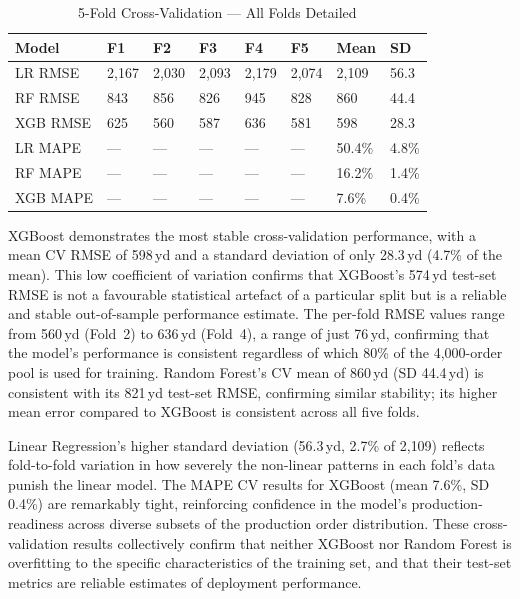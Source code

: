 {\scriptsize
\begin{table}[htbp]
\centering\tabcolsep=4pt\caption{5-Fold Cross-Validation --- All Folds Detailed}\label{tab:cv}
\begin{tabularx}{\textwidth}{@{}Z Y Y Y Y Y Y Y@{}}
  \toprule
  \textbf{Model}&\textbf{F1}&\textbf{F2}&\textbf{F3}&\textbf{F4}&\textbf{F5}&\textbf{Mean}&\textbf{SD}\\
  \midrule
  LR RMSE&2{,}167&2{,}030&2{,}093&2{,}179&2{,}074&2{,}109&56.3\\
  RF RMSE&843&856&826&945&828&860&44.4\\
  XGB RMSE&625&560&587&636&581&598&28.3\\
  LR MAPE&---&---&---&---&---&50.4\%&4.8\%\\
  RF MAPE&---&---&---&---&---&16.2\%&1.4\%\\
  XGB MAPE&---&---&---&---&---&7.6\%&0.4\%\\
  \bottomrule
\end{tabularx}
\end{table}
}

XGBoost demonstrates the most stable cross-validation performance, with a mean CV RMSE of 598\,yd and a standard deviation of only 28.3\,yd (4.7\% of the mean). This low coefficient of variation confirms that XGBoost's 574\,yd test-set RMSE is not a favourable statistical artefact of a particular split but is a reliable and stable out-of-sample performance estimate. The per-fold RMSE values range from 560\,yd (Fold~2) to 636\,yd (Fold~4), a range of just 76\,yd, confirming that the model's performance is consistent regardless of which 80\% of the 4{,}000-order pool is used for training. Random Forest's CV mean of 860\,yd (SD 44.4\,yd) is consistent with its 821\,yd test-set RMSE, confirming similar stability; its higher mean error compared to XGBoost is consistent across all five folds.

Linear Regression's higher standard deviation (56.3\,yd, 2.7\% of 2{,}109) reflects fold-to-fold variation in how severely the non-linear patterns in each fold's data punish the linear model. The MAPE CV results for XGBoost (mean 7.6\%, SD 0.4\%) are remarkably tight, reinforcing confidence in the model's production-readiness across diverse subsets of the production order distribution. These cross-validation results collectively confirm that neither XGBoost nor Random Forest is overfitting to the specific characteristics of the training set, and that their test-set metrics are reliable estimates of deployment performance.

